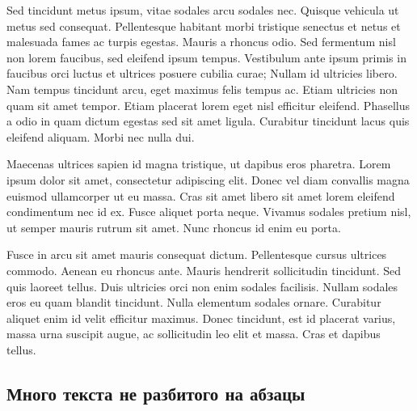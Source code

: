 Sed tincidunt metus ipsum, vitae sodales arcu sodales nec. Quisque vehicula ut metus sed consequat. Pellentesque habitant morbi tristique senectus et netus et malesuada fames ac turpis egestas. Mauris a rhoncus odio. Sed fermentum nisl non lorem faucibus, sed eleifend ipsum tempus. Vestibulum ante ipsum primis in faucibus orci luctus et ultrices posuere cubilia curae; Nullam id ultricies libero. Nam tempus tincidunt arcu, eget maximus felis tempus ac. Etiam ultricies non quam sit amet tempor. Etiam placerat lorem eget nisl efficitur eleifend. Phasellus a odio in quam dictum egestas sed sit amet ligula. Curabitur tincidunt lacus quis eleifend aliquam. Morbi nec nulla dui.

Maecenas ultrices sapien id magna tristique, ut dapibus eros pharetra. Lorem ipsum dolor sit amet, consectetur adipiscing elit. Donec vel diam convallis magna euismod ullamcorper ut eu massa. Cras sit amet libero sit amet lorem eleifend condimentum nec id ex. Fusce aliquet porta neque. Vivamus sodales pretium nisl, ut semper mauris rutrum sit amet. Nunc rhoncus id enim eu porta.

Fusce in arcu sit amet mauris consequat dictum. Pellentesque cursus ultrices commodo. Aenean eu rhoncus ante. Mauris hendrerit sollicitudin tincidunt. Sed quis laoreet tellus. Duis ultricies orci non enim sodales facilisis. Nullam sodales eros eu quam blandit tincidunt. Nulla elementum sodales ornare. Curabitur aliquet enim id velit efficitur maximus. Donec tincidunt, est id placerat varius, massa urna suscipit augue, ac sollicitudin leo elit et massa. Cras et dapibus tellus.

\subsection{Много текста не разбитого на абзацы}\label{subsec:chapter_2/section_1/subsection_4}

